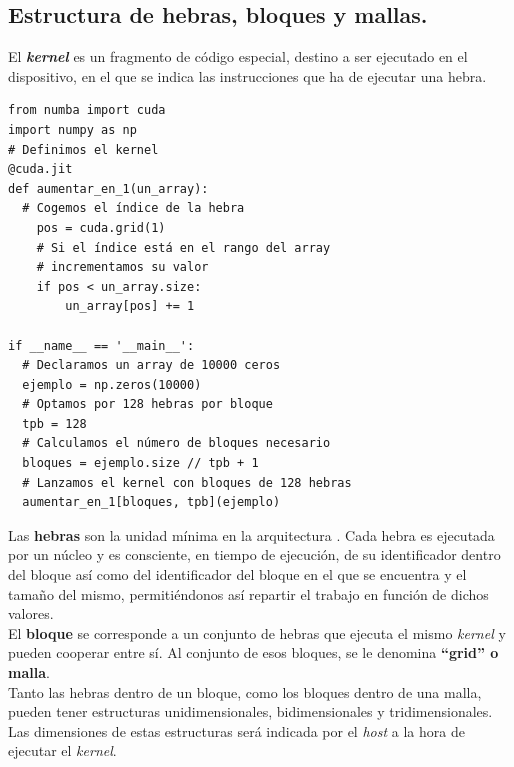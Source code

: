 \subsection{Estructura de hebras, bloques y mallas.}
El \textbf{\textit{kernel}} es un fragmento de código especial, destino a ser ejecutado en el dispositivo, en el que se indica las instrucciones que ha de ejecutar una hebra.\\
\begin{code}
\begin{verbatim}
from numba import cuda
import numpy as np
# Definimos el kernel
@cuda.jit
def aumentar_en_1(un_array):
  # Cogemos el índice de la hebra
    pos = cuda.grid(1)
    # Si el índice está en el rango del array
    # incrementamos su valor
    if pos < un_array.size:
        un_array[pos] += 1

if __name__ == '__main__':
  # Declaramos un array de 10000 ceros
  ejemplo = np.zeros(10000)
  # Optamos por 128 hebras por bloque
  tpb = 128
  # Calculamos el número de bloques necesario
  bloques = ejemplo.size // tpb + 1
  # Lanzamos el kernel con bloques de 128 hebras
  aumentar_en_1[bloques, tpb](ejemplo)
\end{verbatim}
\label{code:numbaexample}
\end{code}

Las \textbf{hebras} son la unidad mínima en la arquitectura \cudanospace. Cada hebra es ejecutada por un núcleo \cuda y es consciente, en tiempo de ejecución, de su identificador dentro del bloque así como del identificador del bloque en el que se encuentra y el tamaño del mismo, permitiéndonos así repartir el trabajo en función de dichos valores.\\

El \textbf{bloque} se corresponde a un conjunto de hebras que ejecuta el mismo \textit{kernel} y pueden cooperar entre sí. Al conjunto de esos bloques, se le denomina \textbf{``grid'' o malla}. \\

Tanto las hebras dentro de un bloque, como los bloques dentro de una malla, pueden tener estructuras unidimensionales, bidimensionales y tridimensionales. Las dimensiones de estas estructuras será indicada por el \textit{host} a la hora de ejecutar el \textit{kernel}.\\

